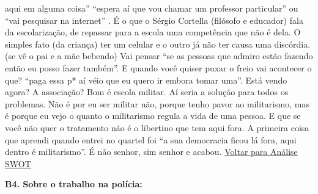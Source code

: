 \documentclass[
	12pt,				%
	openright,			%
	twoside,			%
	a4paper,			%
	chapter=TITLE,		%
	section=TITLE,		%
	subsection=TITLE,	%
	subsubsection=TITLE,%
	spanish,            %
	english,			%
	brazil				%
	]{abntex2}
\begin{document}
\begin{anexosenv}
aqui em alguma coisa” “espera aí que vou chamar um professor particular”  ou “vai pesquisar na internet” . É o que o Sérgio Cortella (filósofo e educador) fala da escolarização, de repassar para a escola uma competência que não é dela. O simples fato (da criança) ter um celular e o outro já não ter causa uma discórdia.  (se vê o pai e a mãe bebendo) Vai pensar “se as pessoas que admiro estão fazendo então eu posso fazer também”. E quando você quiser puxar o freio vai acontecer o que? “paga essa p* aí véio que eu quero ir embora tomar uma”. Está vendo agora? A associação? Bom é escola militar. Aí seria a solução para todos os problemas. Não é por eu ser militar não, porque tenho pavor ao militarismo, mas é porque eu vejo o quanto o militarismo regula a vida de uma pessoa. E que se você não quer o tratamento não é o libertino que tem aqui fora. A primeira coisa que aprendi quando entrei no quartel foi “a sua democracia ficou lá fora, aqui dentro é militarismo”. É não senhor, sim senhor e acabou. \hyperlink{W11}{Voltar para Análise SWOT}
	\hypertarget{B4}{}
	\par
	\textbf{B4. Sobre o trabalho na polícia:}\\

\end{anexosenv}
\end{document}
